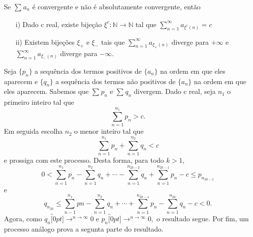 \documentclass[Analysis/analysis_notes.tex]{subfiles}
\begin{document}
\begin{theorem*}
	Se $\sum\limits_{}^{}a_{n}$ \'e convergente e n\~ao \'e absolutamente convergente, ent\~ao
	\begin{itemize}
		\item[i)] Dado c real, existe bije\c c\~ao $\xi^{c}:\mathbb{N}\rightarrow \mathbb{N}$ tal que $\sum\limits_{n=1}^{\infty}a_{\xi^{c}(n)} = c$
		\item[ii)] Existem bije\c c\~oes $\xi_{+}$ e $\xi_{-}$ tais que $\sum_{n=1}^{\infty}a_{\xi_{+}(n)}$ diverge para $+\infty$
		      e $\sum\limits_{n=1}^{\infty}a_{\xi_{-}(n)}$ diverge para $-\infty.$
	\end{itemize}
\end{theorem*}
\begin{proof*}
	Seja $\{p_{n}\}$ a sequ\^encia dos termos positivos de $\{a_{n}\}$ na ordem em que eles aparecem e $\{q_{n}\}$ a sequ\^encia dos termos
	n\~ao positivos de $\{a_{n}\}$ na ordem em que eles aparecem. Sabemos que $\sum\limits_{}^{}p_{n}$ e $\sum\limits_{}^{}q_{n}$ divergem.
	Dado c real, seja $n_{1}$ o primeiro inteiro tal que
	$$
		\sum\limits_{n=1}^{n_{1}}p_{n} > c.
	$$
	Em seguida escolha $n_{2}$ o menor inteiro tal que
	$$
		\sum\limits_{n=1}^{n_{1}}p_{n} + \sum\limits_{n=1}^{n_{2}}q_{n} < c
	$$
	e prossiga com este processo. Desta forma, para todo $k > 1,$
	$$
		0 < \sum\limits_{n=1}^{n_{1}}p_{n} - \sum\limits_{n=1}^{n_{2}}q_{n} + \cdots - \sum\limits_{n=1}^{n_{2k-2}}q_{n} + \sum\limits_{n=1}^{n_{2k-1}}p_{n} - c \leq{p_{n_{2k-1}}}
	$$
	e
	$$
		q_{n_{2k}}\leq{\sum\limits_{n-1}^{n_{1}}pn} - \sum\limits_{n=1}^{n_{2}}q_{n} + \cdots + \sum\limits_{n=1}^{n_{2k-1}}p_{n} - \sum\limits_{n=1}^{n_{2k}}q_{n} - c < 0.
	$$
	Agora, como $q_{n}\overbracket[0pt]{\longrightarrow}^{n\to \infty}0$ e $p_{n}\overbracket[0pt]{\longrightarrow}^{n\to \infty}0,$ o resultado segue.
	Por fim, um processo an\'alogo prova a segunta parte do resultado. \qedsymbol
\end{proof*}
\end{document}
